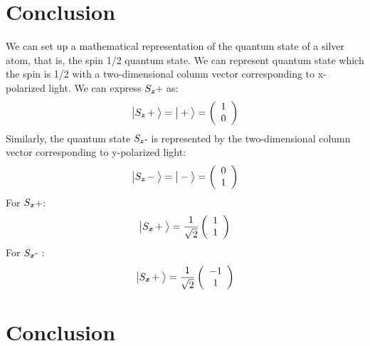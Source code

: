 \documentclass[a4paper]{article}
\def\mathbi#1{\textbf{\em #1}}
\newcommand{\ket}[1]{\big|  #1 \big \rangle }
\begin{document}
\section{Conclusion}
We can set up a mathematical representation of the quantum state of a silver atom, that is, the spin 1/2 quantum state. We can represent  quantum state which the spin is 1/2 with a two-dimensional column vector corresponding to x-polarized light. We can express \textbf{$S_{\mathbi{z}}$}+ as:
\begin{equation}
\ket{\textbf{$S_{\mathbi{z}}$}+}=\ket{+}=\left( \begin{array}{c} 1 \\ 0 \end{array} \right)
\end{equation}
Similarly, the quantum state \textbf{$S_{\mathbi{z}}$}- is represented by the two-dimensional column vector corresponding to y-polarized light:
\begin{equation}
\ket{\textbf{$S_{\mathbi{z}}$}-}=\ket{-}=\left( \begin{array}{c} 0 \\ 1 \end{array} \right)
\end{equation}
For \textbf{$S_{\mathbi{x}}$}+:
\begin{equation}
\ket{\textbf{$S_{\mathbi{x}}$}+}=\frac{1}{\sqrt{2}}\left( \begin{array}{c} 1 \\ 1 \end{array} \right)
\end{equation}
For \textbf{$S_{\mathbi{x}}$}- :
\begin{equation}
\ket{\textbf{$S_{\mathbi{x}}$}+}=\frac{1}{\sqrt{2}}\left( \begin{array}{c} -1 \\ 1 \end{array} \right)
\end{equation}

\section{Conclusion}
\end{document}
